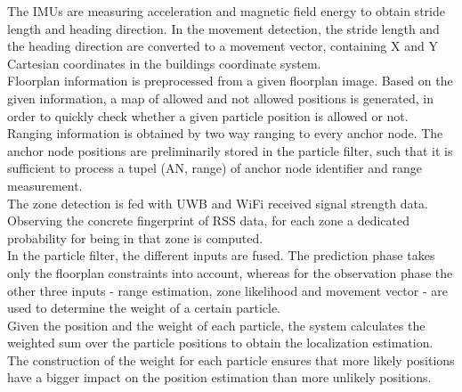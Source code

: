 \noindent\hspace*{5mm}%
The IMUs are measuring acceleration and magnetic field energy to obtain stride length and heading direction. In the movement detection, the stride length and the heading direction are converted to a movement vector, containing X and Y Cartesian coordinates in the buildings coordinate system.\\
\noindent\hspace*{5mm}%
Floorplan information is preprocessed from a given floorplan image. Based on the given information, a map of allowed and not allowed positions is generated, in order to quickly check whether a given particle position is allowed or not.\\
\noindent\hspace*{5mm}%
Ranging information is obtained by two way ranging to every anchor node. The anchor node positions are preliminarily stored in the particle filter, such that it is sufficient to process a tupel (AN, range) of anchor node identifier and range measurement.\\
\noindent\hspace*{5mm}%
The zone detection is fed with UWB and WiFi received signal strength data. Observing the concrete fingerprint of RSS data, for each zone a dedicated probability for being in that zone is computed.\\
\noindent\hspace*{5mm}%
In the particle filter, the different inputs are fused. The prediction phase takes only the floorplan constraints into account, whereas for the observation phase the other three inputs - range estimation, zone likelihood and movement vector - are used to determine the weight of a certain particle.\\
\noindent\hspace*{5mm}%
Given the position and the weight of each particle, the system calculates the weighted sum over the particle positions to obtain the localization estimation. The construction of the weight for each particle ensures that more likely positions have a bigger impact on the position estimation than more unlikely positions.
